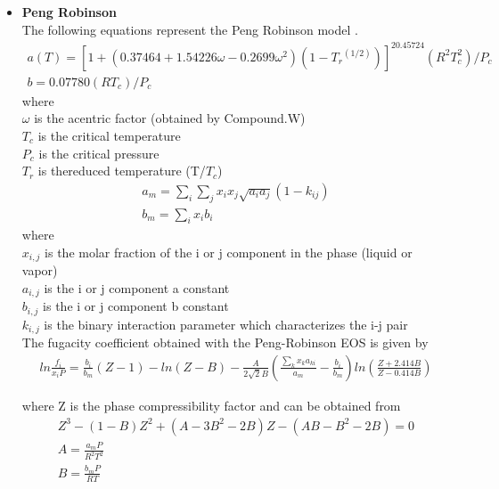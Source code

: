 \documentclass[12pt]{report}
\begin{document}
\begin{itemize}
\item{\textbf{Peng Robinson}} \\
The following equations represent the Peng Robinson model \cite{PR}.
\begin{gather*}
a(T) = [1+(0.37464 + 1.54226\omega - 0.2699\omega^2)(1-T{_r}^{(1/2)})] ^20.45724(R^2T_c^2)/P_c \\
b = 0.07780(RT_c)/P_c
\end{gather*}
where \\
$\omega$ is the acentric factor (obtained by Compound.W) \\
$T_c$ is the critical temperature \\
$P_c$ is the critical pressure \\
$T_r$  is thereduced temperature (T/$T_c$) \\
\begin{gather*}
a_m = \sum_i\sum_jx_ix_j\sqrt{a_ia_j}(1-k_{ij}) \\
b_m = \sum_ix_ib_i
\end{gather*}
where \\
$x_{i,j}$ is the molar fraction of the i or j component in the phase (liquid or vapor) \\
$a_{i,j}$ is the i or j component a constant \\
$b_{i,j}$ is the i or j component b constant \\
$k_{i,j}$ is the binary interaction parameter which characterizes the i-j pair \\

The fugacity coefficient obtained with the Peng-Robinson EOS \cite{DWSIM} is given by
\begin{gather*}
ln\frac{f_i}{x_iP} = \frac{b_i}{b_m}(Z-1) - ln(Z-B) - \frac{A}{2\sqrt{2}B}(\frac{\sum_kx_ka_{ki}}{a_m} - \frac{b_i}{b_m})ln(\frac{Z+2.414B}{Z-0.414B})
\end{gather*}

where Z is the phase compressibility factor and can be obtained from 
\begin{gather*}
Z^3 - (1-B)Z^2 + (A-3B^2-2B)Z - (AB-B^2-2B) = 0 \\
A = \frac{a_mP}{R^2T^2} \\
B = \frac{b_mP}{RT} \\
\end{gather*}


\end{itemize}
\end{document}
